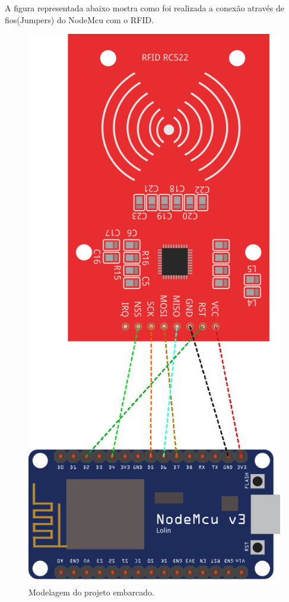 \documentclass[12pt]{article}
\begin{document}
A figura representada abaixo mostra como foi realizada a conexão através de fios(Jumpers) do NodeMcu com o RFID.
\begin{figure}[H]
\centering
\includegraphics[scale=.70]{SketchArduino.png}
\caption{Modelagem do projeto embarcado.}
\end{figure}
\end{document}
